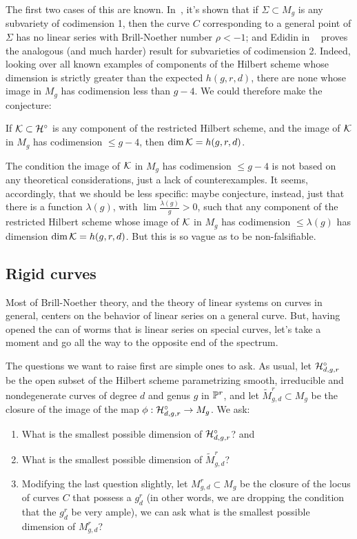 The first two cases of this are known. In~\cite{Eisenbud-Harris}, it's shown that if $\Sigma \subset M_g$ is any subvariety of codimension 1, then the curve $C$ corresponding to a general point of $\Sigma$ has no linear series with Brill-Noether number $\rho < -1$; and Edidin in ~\cite{Edidin} proves the analogous (and much harder) result for subvarieties of codimension 2. Indeed, looking over all known examples of components of the Hilbert scheme whose dimension is strictly greater than the expected $h(g,r,d)$, there are none whose image in $M_g$ has codimension less than $g-4$. We could therefore make the conjecture:

\begin{conjecture}
If ${\cal K} \subset {\cal H}^\circ$ is any component of the restricted Hilbert scheme, and the image of ${\cal K}$ in $M_g$ has codimension $\leq g-4$, then $\dim {\cal K} = h(g,r,d)$.
\end{conjecture}

The condition the image of ${\cal K}$ in $M_g$ has codimension $\leq g-4$ is not based on any theoretical considerations, just a lack of counterexamples. It seems, accordingly, that we should be less specific: maybe conjecture, instead, just that there is a function $\lambda(g)$, with $\lim \frac{\lambda(g)}{g} > 0$, such that any component of the restricted Hilbert scheme whose image of ${\cal K}$ in $M_g$ has codimension $\leq \lambda(g)$ has dimension $\dim {\cal K} = h(g,r,d)$. But this is so vague as to be non-falsifiable.

\subsection{Rigid curves} Most of Brill-Noether theory, and the theory of linear systems on curves in general, centers on the behavior of linear series on a general curve. But, having opened the can of worms that is linear series on special curves, let's take a moment and go all the way to the opposite end of the spectrum.

The questions we want to raise first are simple ones to ask. As usual, let ${\cal H}^\circ_{d,g,r}$ be the open subset of the Hilbert scheme parametrizing smooth, irreducible and nondegenerate curves of degree $d$ and genus $g$ in ${\mathbb P}^r$, and let $\tilde M^r_{g,d} \subset M_g$ be the closure of the image of the map $\phi : {\cal H}^\circ_{d,g,r}\to M_g$. We ask:
\begin{enumerate}
\item What is the smallest possible dimension of ${\cal H}^\circ_{d,g,r}$? \; and
\item What is the smallest possible dimension of $\tilde M^r_{g,d}$?
\item Modifying the last question slightly, let $M^r_{g,d} \subset M_g$ be the closure of the locus of curves $C$ that possess a $g^r_d$ (in other words, we are dropping the condition that the $g^r_d$ be very ample), we can ask what is the smallest possible dimension of $M^r_{g,d}$?
\end{enumerate}


